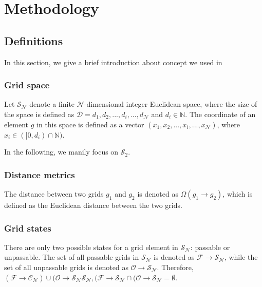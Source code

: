 \documentclass[letterpaper, 10 pt, journal, twoside]{IEEEtran}
\begin{document}
\section{Methodology}
\label{Methodology}

\subsection{Definitions}
In this section, we give a brief introduction about concept we used in 
\subsubsection{Grid space}

Let $\mathcal{S}_{\mathcal{N}}$ denote a finite $\mathcal{N}$-dimensional integer Euclidean space, where the size of the space is defined as $\mathcal{D}={d_{1}, d_{2},...,d_{i},...,d_\mathcal{N}}$ and $d_{i} \in \mathbb{N}$. The coordinate of an element $\textit{g}$ in this space is defined as a vector $(x_1,x_2,...,x_i,...,x_{\mathcal{N}})$, where $x_i \in ([0,d_i) \cap \mathbb{N})$. 

In the following, we manily focus on $\mathcal{S}_{2}$.

\subsubsection{Distance metrics}

The distance between two grids ${\textit{g}}_{1}$ and $\textit{g}_{2}$ is denoted as $\Omega({\textit{g}}_{1} \rightarrow \textit{g}_{2})$, which is defined as the Euclidean distance between the two grids.

\subsubsection{Grid states}

There are only two possible states for a grid element in $\mathcal{S}_{\mathcal{N}}$: passable or unpassable. The set of all passable grids in $\mathcal{S}_{\mathcal{N}}$ is denoted as $\mathcal{F} \rightarrow \mathcal{S}_{\mathcal{N}}$, while the set of all unpassable grids is denoted as $\mathcal{O} \rightarrow \mathcal{S}_{\mathcal{N}}$. Therefore, $(\mathcal{F} \rightarrow \mathcal{C}_{\mathcal{N}}) \cup (\mathcal{O} \rightarrow \mathcal{S}_{\mathcal{N}} \mathcal{S}_{\mathcal{N}}, (\mathcal{F} \rightarrow \mathcal{S}_{\mathcal{N}} \cap (\mathcal{O} \rightarrow \mathcal{S}_{\mathcal{N}} = \emptyset$. 
\end{document}
